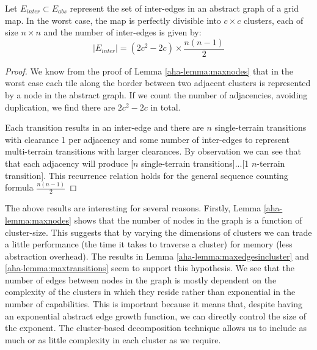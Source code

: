 \begin{lemma}
\label{aha-lemma:maxtransitions}
Let $E_{inter} \subset E_{abs}$ represent the set of inter-edges in an abstract graph of a grid map. In the worst case, the map is perfectly divisible into $c \times c$ clusters, each of size $n \times n$ and the number of inter-edges is given by:
$$|E_{inter}| = (2c^2 - 2c)\times \frac{n(n-1)}{2}$$
\end{lemma}

\begin{proof}
We know from the proof of Lemma \ref{aha-lemma:maxnodes} that in the worst case each tile along the border between two adjacent clusters is represented by a node in the abstract graph. 
If we count the number of adjacencies, avoiding duplication, we find there are $2c^2 - 2c$ in total.
\par \indent
Each transition results in an inter-edge and there are $n$ single-terrain transitions with clearance 1 per adjacency and some number of inter-edges to represent multi-terrain transitions with larger clearances. 
By observation we can see that that each adjacency will produce [$n$ single-terrain transitions]...[1 $n$-terrain transition]. 
This recurrence relation holds for the general sequence counting formula $\frac{n(n-1)}{2}$
\end{proof}

The above results are interesting for several reasons. 
Firstly, Lemma \ref{aha-lemma:maxnodes} shows that the number of nodes in the graph is a function of cluster-size. This suggests that by varying the dimensions of clusters we can trade a little performance (the time it takes to traverse a cluster) for memory (less abstraction overhead).
The results in Lemma \ref{aha-lemma:maxedgesincluster} and \ref{aha-lemma:maxtransitions} seem to support this hypothesis. 
We see that the number of edges between nodes in the graph is mostly dependent on the complexity of the clusters in which they reside rather than exponential in the number of capabilities. 
This is important because it means that, despite having an exponential abstract edge growth function, we can directly control the size of the exponent.
The cluster-based decomposition technique allows us to include as much or as little complexity in each cluster as we require.
